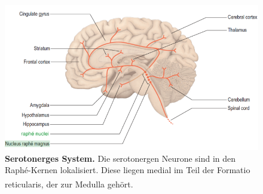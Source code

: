 \documentclass[12pt,a4paper,pdftex]{article}
\begin{document}
\begin{figure}[H]
    \centering
    \includegraphics[width=\textwidth]{pictures/Bilder_monoamine_systeme/serotonerges_system.PNG}
    \caption[Serotonerges System]{\textbf{Serotonerges System.} Die serotonergen Neurone sind in den Raphé-Kernen lokalisiert. Diese liegen medial im Teil der Formatio reticularis, der zur Medulla gehört. \textsuperscript{\cite[9]{crossman2014neuroanatomy}}}
    \label{fig:serotonerges_system}
\end{figure}{}
\end{document}
